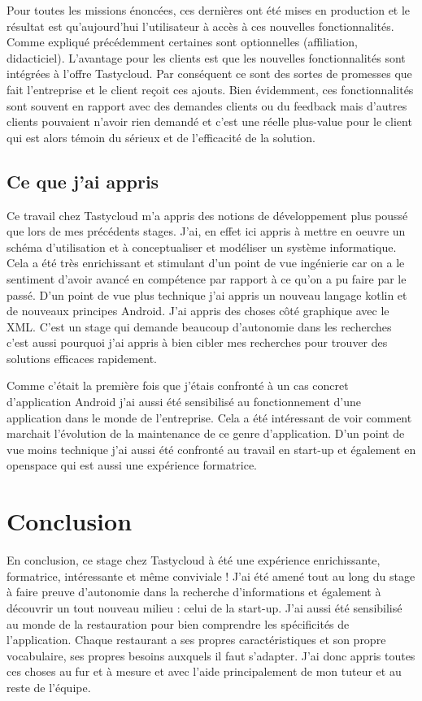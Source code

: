 Pour toutes les missions énoncées, ces dernières ont été mises en production et le résultat est qu'aujourd'hui l'utilisateur à accès à ces nouvelles fonctionnalités. Comme expliqué précédemment certaines sont optionnelles (affiliation, didacticiel). L'avantage pour les clients est que les nouvelles fonctionnalités sont intégrées à l'offre Tastycloud. Par conséquent ce sont des sortes de promesses que fait l'entreprise et le client reçoit ces ajouts. Bien évidemment, ces fonctionnalités sont souvent en rapport avec des demandes clients ou du feedback mais d'autres clients pouvaient n'avoir rien demandé et c'est une réelle plus-value pour le client qui est alors témoin du sérieux et de l'efficacité de la solution.

\section{Ce que j'ai appris}

Ce travail chez Tastycloud m'a appris des notions de développement plus poussé que lors de mes précédents stages. J'ai, en effet ici appris à mettre en oeuvre un schéma d'utilisation et à conceptualiser et modéliser un système informatique. Cela a été très enrichissant et stimulant d'un point de vue ingénierie car on a le sentiment d'avoir avancé en compétence par rapport à ce qu'on a pu faire par le passé. D'un point de vue plus technique j'ai appris un nouveau langage kotlin et de nouveaux principes Android. J'ai appris des choses côté graphique avec le XML. C'est un stage qui demande beaucoup d'autonomie dans les recherches c'est aussi pourquoi j'ai appris à bien cibler mes recherches pour trouver des solutions efficaces rapidement. 

Comme c'était la première fois que j'étais confronté à un cas concret d'application Android j'ai aussi été sensibilisé au fonctionnement d'une application dans le monde de l'entreprise. Cela a été intéressant de voir comment marchait l'évolution de la maintenance de ce genre d'application. D'un point de vue moins technique j'ai aussi été confronté au travail en start-up et également en openspace qui est aussi une expérience formatrice.

    
\chapter{Conclusion}
\label{sec:conclusion}

En conclusion, ce stage chez Tastycloud à été une expérience enrichissante, formatrice, intéressante et même conviviale ! J’ai été amené tout au long du stage à faire preuve d’autonomie dans la recherche d’informations et également à découvrir un tout nouveau milieu : celui de la start-up. J'ai aussi été sensibilisé au monde de la restauration pour bien comprendre les spécificités de l'application. Chaque restaurant a ses propres caractéristiques et son propre vocabulaire, ses propres besoins auxquels il faut s'adapter. J'ai donc appris toutes ces choses au fur et à mesure et avec l’aide principalement de mon tuteur et au reste de l'équipe.

